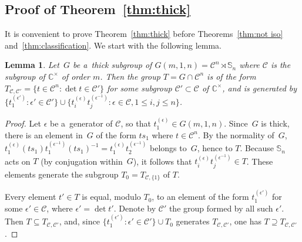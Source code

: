 \documentclass[pdftex]{sigma}
\newtheorem{Lemma}[Theorem]{Lemma}
\begin{document}
\subsection*{Proof of Theorem~\ref{thm:thick}}

It is convenient to prove Theorem~\ref{thm:thick} before Theorems~\ref{thm:not iso} and~\ref{thm:classification}.
We start with the following lemma.

\begin{Lemma}
\label{lem:torus}
Let~$G$ be a~thick subgroup of $G(m,1,n)={\mathcal C}^n\rtimes \mathbb S_n$ where ${\mathcal C}$ is the subgroup of
${\mathbb C}^\times$ of order $m$.
Then the group $T=G\cap {\mathcal C}^n$ is of the form $T_{{\mathcal C},{\mathcal C}'}=\{t\in {\mathcal C}^n: \det
t\in {\mathcal C}'\}$ for some subgroup ${\mathcal C}'\subset {\mathcal C}$ of $\mathbb C^\times$, and is generated by
$ \big\{t_1^{(\epsilon')}: \epsilon'\in{\mathcal C}'\big\} \cup \big\{t_i^{(\epsilon)}t_j^{(\epsilon^{-1})}: \epsilon \in {\mathcal C},1\le i,j\le n\big\}$.
\end{Lemma}

\begin{proof}
Let $\epsilon$ be a~generator of ${\mathcal C}$,  so that $t_1^{(\epsilon)}\in G(m,1,n)$.
Since~$G$ is thick, there is an element in~$G$ of the form $ts_1$ where $t\in {\mathcal C}^n$.
By the normality of~$G$, $ t_1^{(\epsilon)} (ts_1) t_1^{(\epsilon^{-1})} (ts_1)^{-1}=
t_1^{(\epsilon)}t_2^{(\epsilon^{-1})}$ belongs to~$G$, hence to $T$.
Because $\mathbb S_n$ acts on $T$ (by conjugation within~$G$), it follows that $t_i^{(\epsilon)}t_j^{(\epsilon^{-1})}\in
T$.
These elements generate the subgroup $T_0=T_{{\mathcal C},\{1\}}$ of $T$.

Every element $t'\in T$ is equal, modulo $T_0$, to an element of the form $t_1^{(\epsilon')}$ for some $\epsilon'\in
{\mathcal C}$, where $\epsilon'=\det t'$.
Denote by ${\mathcal C}'$ the group formed by all such $\epsilon'$.
Then $T\subseteq T_{{\mathcal C},{\mathcal C}'}$, and, since $\{ {t_1^{(\epsilon')}: \epsilon'\in {\mathcal C}'}\}\cup
T_0 $ generates $T_{{\mathcal C},{\mathcal C}'}$, one has $T\supseteq T_{{\mathcal C},{\mathcal C}'}$.
\end{proof}
\end{document}
